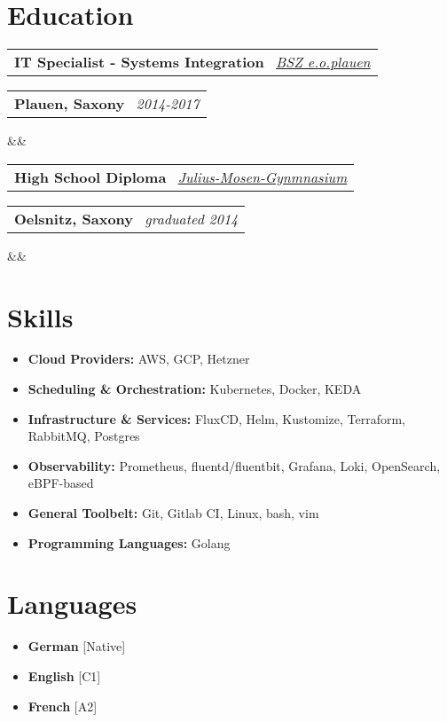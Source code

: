 \documentclass[11pt,a4paper,sans]{moderncv}
\makeatletter
\newcommand*{\customcventry}[7][.13em]{
\begin{tabular}{@{}l}
{\bfseries #4} \
{\itshape #3}
\end{tabular}
\hfill
\begin{tabular}{l@{}}
{\bfseries #5} \
{\itshape #2}
\end{tabular}
\ifx&#7&%
\else{\
\begin{minipage}{\maincolumnwidth}%
\small#7%
\end{minipage}}\fi%
\par\addvspace{#1}}
\makeatother
\begin{document}
\section{Education}
\customcventry{2014-2017}{\color{blue}\href{https://www.bsz-eoplauen.de/}{BSZ e.o.plauen}}{IT Specialist - Systems Integration}{Plauen, Saxony}{}{}
\customcventry{graduated 2014}{\color{blue}\href{https://www.mosengymnasium.de/}{Julius-Mosen-Gynmnasium}}{High School Diploma}{Oelsnitz, Saxony}{}{}

\section{Skills}
{\begin{itemize}[label=\textbullet]
\item {\textbf{Cloud Providers:} AWS, GCP, Hetzner}
\item {\textbf{Scheduling \& Orchestration:} Kubernetes, Docker, KEDA}
\item {\textbf{Infrastructure \& Services:} FluxCD, Helm, Kustomize, Terraform, RabbitMQ, Postgres}
\item {\textbf{Observability:} Prometheus, fluentd/fluentbit, Grafana, Loki, OpenSearch, eBPF-based}
\item {\textbf{General Toolbelt:} Git, Gitlab CI, Linux, bash, vim}
\item {\textbf{Programming Languages:} Golang}
\end{itemize}}

\section{Languages}
\begin{multicols}{2}
    \begin{itemize}[label=\textbullet]
    \item \textbf{German} [Native]
    \item {\textbf{English} [C1]}
    \item {\textbf{French} [A2]}
    \end{itemize}
\end{multicols}
\end{document}

